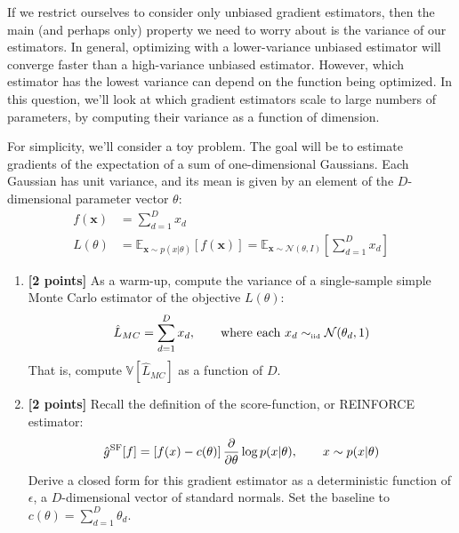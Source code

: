 \documentclass{harvardml}
\def\simiid{\sim_{\mbox{\tiny iid}}}
\newcommand{\bx}{\mathbf{x}}
\newcommand{\distNorm}{\mathcal{N}}
\newcommand{\var}{\mathbb{V}}
\newcommand{\E}{\mathbb{E}}
\newcommand{\PT}{\frac{\partial}{\partial \theta}}
\theoremstyle{plain}
\begin{document}







\begin{problem}

If we restrict ourselves to consider only unbiased gradient estimators, then the main (and perhaps only) property we need to worry about is the variance of our estimators.
In general, optimizing with a lower-variance unbiased estimator will converge faster than a high-variance unbiased estimator.
However, which estimator has the lowest variance can depend on the function being optimized.
In this question, we'll look at which gradient estimators scale to large numbers of parameters, by computing their variance as a function of dimension.

For simplicity, we'll consider a toy problem.
The goal will be to estimate gradients of the expectation of a sum of one-dimensional Gaussians.
Each Gaussian has unit variance, and its mean is given by an element of the $D$-dimensional parameter vector $\theta$:
%
\begin{align}
f(\bx) & = \sum_{d=1}^D x_d \\
L(\theta) & = \E_{\bx \sim p(x|\theta)} \left[ f(\bx) \right]
= \E_{\bx \sim \distNorm(\theta, I)} \left[ \sum_{d=1}^D x_d \right]
\end{align}



\begin{enumerate}[label=(\alph*)]
\item {\bf [2 points]} As a warm-up, compute the variance of a single-sample simple Monte Carlo estimator of the objective $L(\theta)$:
%
\begin{align}
\hat L_{MC} 
= \sum_{d=1}^D x_d, \qquad \textnormal{where each } x_d \simiid \distNorm(\theta_d, 1)
\end{align}
%
That is, compute $\var \left[ \hat L_{MC} \right]$ as a function of $D$.

\item {\bf [2 points]}
Recall the definition of the score-function, or REINFORCE estimator:
%
\begin{align}
\hat g^\textnormal{SF}[f] = \left[f(x) - c(\theta) \right] \PT \log p(x | \theta), \qquad x \sim p(x | \theta)
\end{align}
%
Derive a closed form for this gradient estimator as a deterministic function of $\epsilon$, a $D$-dimensional vector of standard normals.
Set the baseline to $c(\theta) = \sum_{d=1}^D \theta_d$.


\end{enumerate}
\end{problem}
\end{document}
